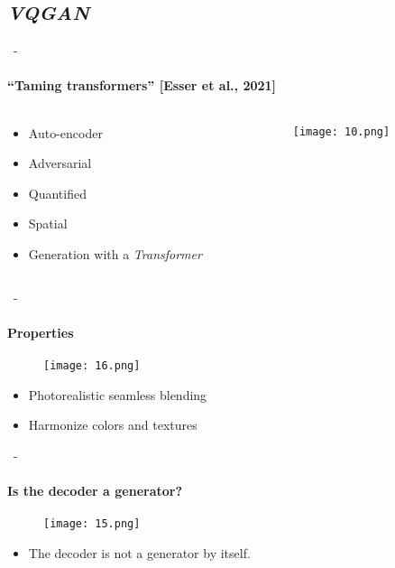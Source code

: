 \documentclass[aspectratio=169, 22pt]{beamer}
\begin{document}
\subsection{\emph{VQGAN}}
\begin{frame}{\secname~- \subsecname}
  \framesubtitle{``Taming transformers'' [Esser et al., 2021]}
  \begin{columns}
    \begin{column}{0.2\linewidth}
      \begin{itemize}
      \item \small Auto-encoder
      \item \small Adversarial
      \item \small Quantified
      \item \small Spatial
        \vspace{1em}
      \item \small Generation with a \emph{Transformer}
      \end{itemize}
    \end{column}
    \begin{column}{0.8\linewidth}
      \begin{figure}
        \texttt{[image: 10.png]}
      \end{figure}
    \end{column}
  \end{columns}
\end{frame}

\begin{frame}{\secname~- \subsecname}
  \framesubtitle{Properties}
  \begin{figure}
    \texttt{[image: 16.png]}
  \end{figure}
  \begin{itemize}
  \item Photorealistic \alert{seamless blending}
  \item \alert{Harmonize} colors and textures
\end{itemize}
\end{frame}

\begin{frame}{\secname~- \subsecname}
  \framesubtitle{Is the decoder a generator?}
  \begin{figure}
    \texttt{[image: 15.png]}
  \end{figure}
  \begin{itemize}
  \item The decoder \alert{is not} a generator by itself.
  \end{itemize}
\end{frame}
\end{document}
